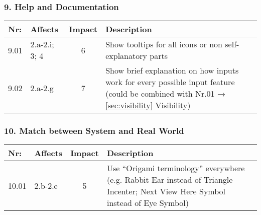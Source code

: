 \subsubsection*{9. Help and Documentation}
        \begin{tabular}{l | p{} | c | p{}}
        Nr: & Affects & Impact & Description \\ \hline
        9.01 & 2.a-2.i; 3; 4 & 6 & Show tooltips for all icons or non self-explanatory parts\\ \hline 
        9.02 & 2.a-2.g & 7 & Show brief explanation on how inputs work for every possible input feature (could be combined with Nr.01 → \ref{sec:visibility} Visibility)\\ \hline
        \end{tabular}

\subsubsection*{10. Match between System and Real World}
        \begin{tabular}{l | p{} | c | p{}}
        Nr: & Affects & Impact & Description \\ \hline
        10.01 & 2.b-2.e & 5 & Use ``Origami terminology'' everywhere (e.g. Rabbit Ear instead of Triangle Incenter; Next View Here Symbol instead of Eye Symbol)\\ \hline
        \end{tabular}
